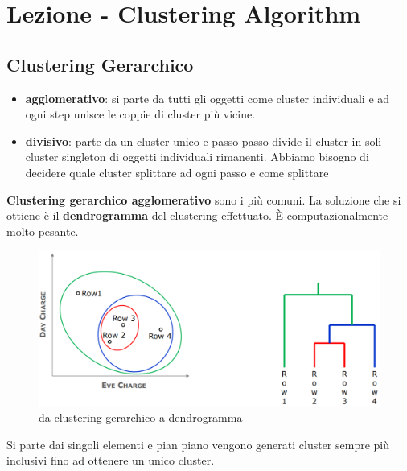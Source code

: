 \section{Lezione - Clustering Algorithm}

\subsection{Clustering Gerarchico}
\begin{itemize}
	\item \textbf{agglomerativo}: si parte da tutti gli oggetti come cluster individuali e ad ogni step unisce le coppie di cluster pi\`u vicine.
	\item \textbf{divisivo}: parte da un cluster unico e passo passo divide il cluster in soli cluster singleton di oggetti individuali rimanenti. Abbiamo bisogno di decidere quale cluster splittare ad ogni passo e come splittare
\end{itemize}

\textbf{Clustering gerarchico agglomerativo} sono i pi\`u comuni. La soluzione che si ottiene \`e il \textbf{dendrogramma} del clustering effettuato. \`E computazionalmente molto pesante.

\begin{figure}[h!]
	\centering
	\includegraphics[height=0.45 \linewidth]{pict/cluster_aggl.png}
	\caption{da clustering gerarchico a dendrogramma}
\end{figure}

Si parte dai singoli elementi e pian piano vengono generati cluster sempre pi\`u inclusivi fino ad ottenere un unico cluster. \\

